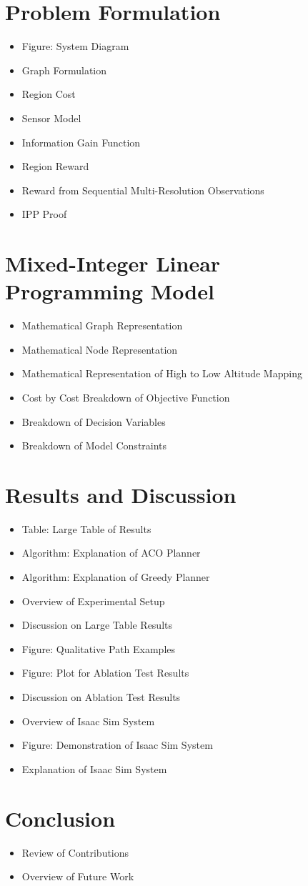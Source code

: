 \documentclass[11pt,a4paper,twoside]{article}
\begin{document}
\section*{Problem Formulation}
\begin{itemize}
    \item Figure: System Diagram
    \item Graph Formulation
    \item Region Cost
    \item Sensor Model
    \item Information Gain Function
    \item Region Reward
    \item Reward from Sequential Multi-Resolution Observations
    \item IPP Proof
\end{itemize}

\section*{Mixed-Integer Linear Programming Model}
\begin{itemize}
    \item Mathematical Graph Representation
    \item Mathematical Node Representation
    \item Mathematical Representation of High to Low Altitude Mapping
    \item Cost by Cost Breakdown of Objective Function
    \item Breakdown of Decision Variables
    \item Breakdown of Model Constraints
\end{itemize}

\section*{Results and Discussion}
\begin{itemize}
    \item Table: Large Table of Results 
    \item Algorithm: Explanation of ACO Planner
    \item Algorithm: Explanation of Greedy Planner
    \item Overview of Experimental Setup
    \item Discussion on Large Table Results
    \item Figure: Qualitative Path Examples
    \item Figure: Plot for Ablation Test Results
    \item Discussion on Ablation Test Results
    \item Overview of Isaac Sim System
    \item Figure: Demonstration of Isaac Sim System
    \item Explanation of Isaac Sim System
\end{itemize}

\section*{Conclusion}
\begin{itemize}
    \item Review of Contributions
    \item Overview of Future Work
\end{itemize}
\end{document}
